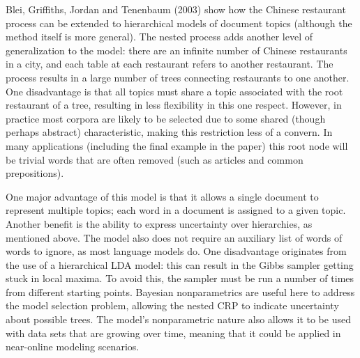 \documentclass[12pt,letterpaper]{article}
\begin{document}

\linespread{2.0}

Blei, Griffiths, Jordan and Tenenbaum (2003) show how the Chinese restaurant process can be extended to hierarchical models of document topics (although the method itself is more general). The nested process adds another level of generalization to the model: there are an infinite number of Chinese restaurants in a city, and each table at each restaurant refers to another restaurant. The process results in a large number of trees connecting restaurants to one another. One disadvantage is that all topics must share a topic associated with the root restaurant of a tree, resulting in less flexibility in this one respect. However, in practice most corpora are likely to be selected due to some shared (though perhaps abstract) characteristic, making this restriction less of a convern. In many applications (including the final example in the paper) this root node will be trivial words that are often removed (such as articles and common prepositions). 

One major advantage of this model is that it allows a single document to represent multiple topics; each word in a document is assigned to a given topic. Another benefit is the ability to express uncertainty over hierarchies, as mentioned above. The model also does not require an auxiliary list of words of words to ignore, as most language models do. One disadvantage originates from the use of a hierarchical LDA model: this can result in the Gibbs sampler getting stuck in local maxima. To avoid this, the sampler must be run a number of times from different starting points. Bayesian nonparametrics are useful here to address the model selection problem, allowing the nested CRP to indicate uncertainty about possible trees. The model's nonparametric nature also allows it to be used with data sets that are growing over time, meaning that it could be applied in near-online modeling scenarios. 
\end{document}

